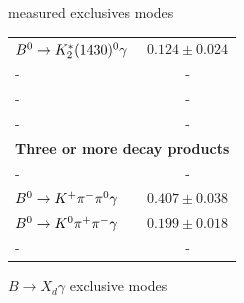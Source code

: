 \documentclass[xcolor=dvipsnames]{beamer}
\begin{document}
\begin{frame}{\BtoXsdgamma measured exclusives modes}
\begin{minipage}[c]{0.395\textwidth}
{\begin{tabular}{|lc|}
          $B^0 \rightarrow K_2^*(1430)^0 \gamma$ & $0.124 \pm 0.024$ \\ 
          - & -\\
          - & -\\
          - & -\\
          \hline
          \multicolumn{2}{|c|}{\textbf{Three or more decay products}}\\
          - & -\\
          $B^0 \rightarrow K^+ \pi^-\pi^0 \gamma$ & $0.407 \pm 0.038$\\
          $B^0 \rightarrow K^0 \pi^+\pi^- \gamma$ & $0.199 \pm 0.018$\\
          - & -\\
          \hline
      \end{tabular}
      }
  \end{minipage}
  
  \vspace{10pt}
  
  \begin{minipage}[c]{0.395\textwidth}
      \centering
      $B\to X_d\gamma$ exclusive modes
  \end{minipage}
  

\end{frame}
\end{document}
